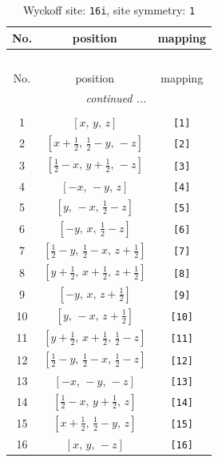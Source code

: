 \documentclass[fleqn,8pt]{jsarticle}
\begin{document}
\begin{longtable}{ccc}
\caption{Wyckoff site: {\tt 16i}, site symmetry: {\tt 1}}
 \\
 \hline \hline
No. & position & mapping \\ \hline \endfirsthead

\multicolumn{2}{l}{\tablename\ \thetable{}} \\
 \hline \hline
No. & position & mapping \\ \hline \endhead

 \hline \hline
\multicolumn{2}{r}{\footnotesize\it continued ...} \\ \endfoot

 \hline \hline
\multicolumn{2}{r}{} \\ \endlastfoot

1 & $\left[ x,\, y,\, z \right]$ & {\tt [1]} \\ \hline
2 & $\left[ x + \frac{1}{2},\, \frac{1}{2} - y,\, - z \right]$ & {\tt [2]} \\ \hline
3 & $\left[ \frac{1}{2} - x,\, y + \frac{1}{2},\, - z \right]$ & {\tt [3]} \\ \hline
4 & $\left[ - x,\, - y,\, z \right]$ & {\tt [4]} \\ \hline
5 & $\left[ y,\, - x,\, \frac{1}{2} - z \right]$ & {\tt [5]} \\ \hline
6 & $\left[ - y,\, x,\, \frac{1}{2} - z \right]$ & {\tt [6]} \\ \hline
7 & $\left[ \frac{1}{2} - y,\, \frac{1}{2} - x,\, z + \frac{1}{2} \right]$ & {\tt [7]} \\ \hline
8 & $\left[ y + \frac{1}{2},\, x + \frac{1}{2},\, z + \frac{1}{2} \right]$ & {\tt [8]} \\ \hline
9 & $\left[ - y,\, x,\, z + \frac{1}{2} \right]$ & {\tt [9]} \\ \hline
10 & $\left[ y,\, - x,\, z + \frac{1}{2} \right]$ & {\tt [10]} \\ \hline
11 & $\left[ y + \frac{1}{2},\, x + \frac{1}{2},\, \frac{1}{2} - z \right]$ & {\tt [11]} \\ \hline
12 & $\left[ \frac{1}{2} - y,\, \frac{1}{2} - x,\, \frac{1}{2} - z \right]$ & {\tt [12]} \\ \hline
13 & $\left[ - x,\, - y,\, - z \right]$ & {\tt [13]} \\ \hline
14 & $\left[ \frac{1}{2} - x,\, y + \frac{1}{2},\, z \right]$ & {\tt [14]} \\ \hline
15 & $\left[ x + \frac{1}{2},\, \frac{1}{2} - y,\, z \right]$ & {\tt [15]} \\ \hline
16 & $\left[ x,\, y,\, - z \right]$ & {\tt [16]} \\
\end{longtable}
\end{document}
